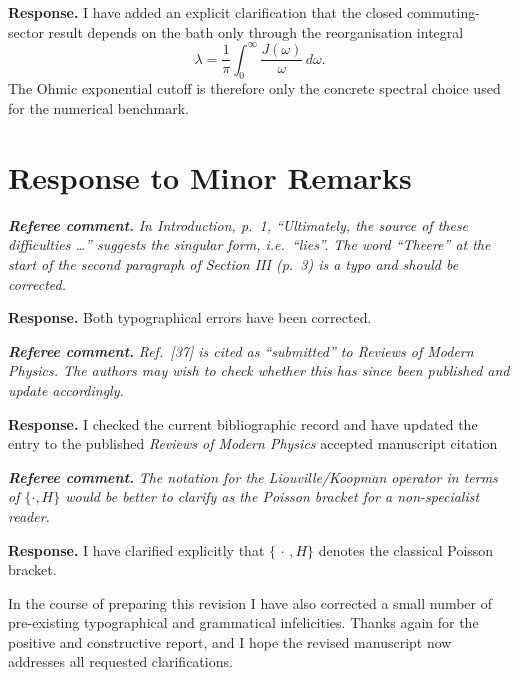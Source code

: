 \documentclass[11pt]{article}
\newcommand{\RC}[1]{\textbf{\textit{Referee comment.}} \textit{#1}}
\newcommand{\AR}[1]{\textbf{Response.} #1}
\begin{document}
\AR{I have added an explicit clarification that the closed commuting-sector result depends on the bath only through the reorganisation integral
\[
    \lambda=\frac{1}{\pi}\int_0^\infty \frac{J(\omega)}{\omega}\,d\omega.
\]
The Ohmic exponential cutoff is therefore only the concrete spectral choice used for the numerical benchmark.}


\section*{Response to Minor Remarks}

\RC{In Introduction, p.~1, ``Ultimately, the source of these difficulties \ldots'' suggests the singular form, i.e.\ ``lies''. The word ``Theere'' at the start of the second paragraph of Section III (p.~3) is a typo and should be corrected.}

\AR{Both typographical errors have been corrected.}


\RC{Ref.~[37] is cited as ``submitted'' to Reviews of Modern Physics. The authors may wish to check whether this has since been published and update accordingly.}

\AR{I checked the current bibliographic record and have updated the entry to the published \emph{Reviews of Modern Physics} accepted manuscript citation}

\RC{The notation for the Liouville/Koopman operator in terms of $\{\cdot,H\}$ would be better to clarify as the Poisson bracket for a non-specialist reader.}

\AR{I have clarified explicitly that $\{\,\cdot\,,H\}$ denotes the classical Poisson bracket.}


In the course of preparing this revision I have also corrected a small number of pre-existing typographical and grammatical infelicities. Thanks again for the positive and constructive report, and I hope the revised manuscript now addresses all requested clarifications.
\end{document}
